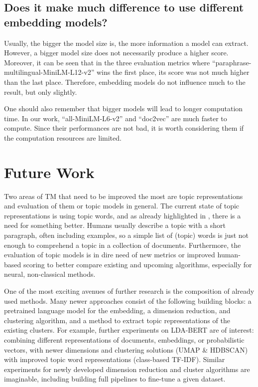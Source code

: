 \documentclass[11pt]{article}
\begin{document}
\subsection{Does it make much difference to use different embedding models?}
Usually, the bigger the model size is, the more information a model can extract. However, a bigger model size does not necessarily produce a higher score. Moreover, it can be seen that in the three evaluation metrics where “paraphrase-multilingual-MiniLM-L12-v2” wins the first place, its score was not much higher than the last place. Therefore, embedding models do not influence much to the result, but only slightly.

One should also remember that bigger models will lead to longer computation time. In our work, “all-MiniLM-L6-v2” and “doc2vec” are much faster to compute. Since their performances are not bad, it is worth considering them if the computation resources are limited.

\section{Future Work}
\label{sec:future}

Two areas of TM that need to be improved the most are topic representations and evaluation of them or topic models in general. The current state of topic representations is using topic words, and as already highlighted in \citet{incoherence}, there is a need for something better. Humans usually describe a topic with a short paragraph, often including examples, so a simple list of (topic) words is just not enough to comprehend a topic in a collection of documents. Furthermore, the evaluation of topic models is in dire need of new metrics or improved human-based scoring to better compare existing and upcoming algorithms, especially for neural, non-classical methods. 

One of the most exciting avenues of further research is the composition of already used methods. Many newer approaches consist of the following building blocks: a pretrained language model for the embedding, a dimension reduction, and clustering algorithm, and a method to extract topic representations of the existing clusters. For example, further experiments on LDA-BERT are of interest: combining different representations of documents, embeddings, or probabilistic vectors, with newer dimensions and clustering solutions (UMAP \& HDBSCAN) with improved topic word representations (class-based TF-IDF). Similar experiments for newly developed dimension reduction and cluster algorithms are imaginable, including building full pipelines to fine-tune a given dataset. 
\end{document}
